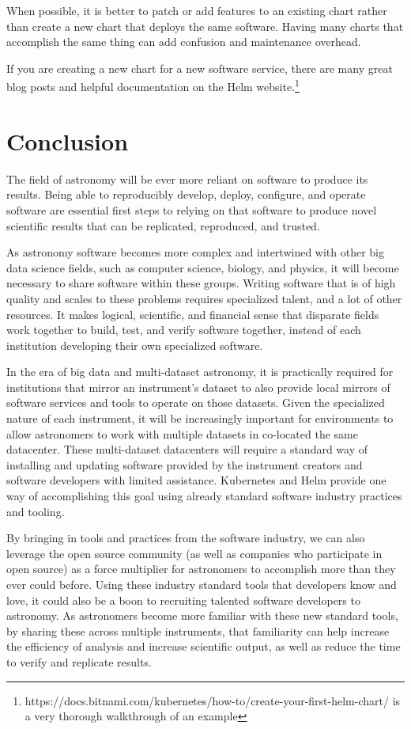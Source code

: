\documentclass[11pt,twoside]{article}
\begin{document}
When possible, it is better to patch or add features to an existing chart rather
than create a new chart that deploys the same software.  Having many charts that
accomplish the same thing can add confusion and maintenance overhead.

If you are creating a new chart for a new software service, there are many great
blog posts and helpful documentation on the Helm website.\footnote{
https://docs.bitnami.com/kubernetes/how-to/create-your-first-helm-chart/
is a very thorough walkthrough of an example}

\section{Conclusion}

The field of astronomy will be ever more reliant on software to produce its results.
Being able to reproducibly develop, deploy, configure, and operate software are
essential first steps to relying on that software to produce novel scientific
results that can be replicated, reproduced, and trusted.

As astronomy software becomes more complex and intertwined with other big
data science fields, such as computer science, biology, and physics, it will
become necessary to share software within these groups.  Writing software that
is of high quality and scales to these problems requires specialized talent,
and a lot of other resources.  It makes logical, scientific, and financial
sense that disparate fields work together to build, test, and verify software
together, instead of each institution developing their own specialized software.

In the era of big data and multi-dataset astronomy, it is practically required
for institutions that mirror an instrument's dataset to also provide local mirrors
of software services and tools to operate on those datasets.  Given the specialized
nature of each instrument, it will be increasingly important for environments
to allow astronomers to work with multiple datasets in co-located the same datacenter.
These multi-dataset datacenters will require a standard
way of installing and updating software provided by the instrument creators and software
developers with limited assistance. Kubernetes and Helm provide one way of accomplishing
this goal using already standard software industry practices and tooling.

By bringing in tools and practices from the software industry, we can also
leverage the open source community (as well as companies who participate in
open source) as a force multiplier for astronomers to accomplish
more than they ever could before. Using these industry standard tools that
developers know and love, it could also be a boon to recruiting talented
software developers to astronomy.  As astronomers become more familiar with
these new standard tools, by sharing these across multiple instruments, that
familiarity can help increase the efficiency of analysis and increase scientific
output, as well as reduce the time to verify and replicate results.



\end{document}
